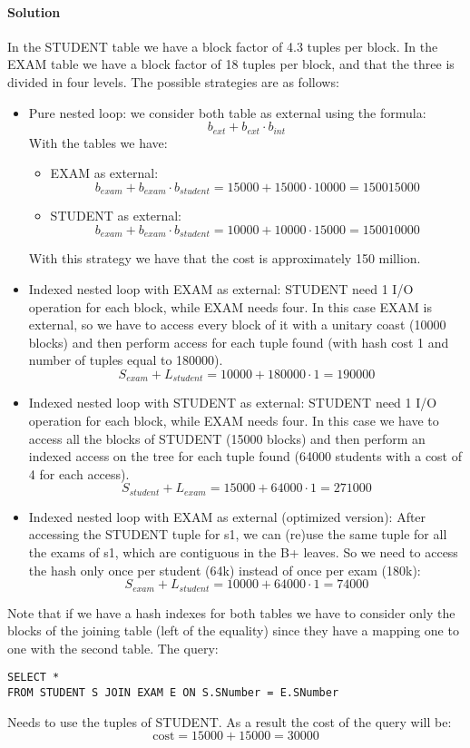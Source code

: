 \paragraph*{Solution}
In the STUDENT table we have a block factor of 4.3 tuples per block. 
In the EXAM table we have a block factor of 18 tuples per block, and that the three is divided in four levels. 
The possible strategies are as follows: 
\begin{itemize}
    \item Pure nested loop: we consider both table as external using the formula: 
        \[b_{ext}+b_{ext}\cdot b_{int}\]
        With the tables we have: 
        \begin{itemize}
            \item EXAM as external: 
                \[b_{exam}+b_{exam}\cdot b_{student}=15000+15000\cdot 10000=150015000\]
            \item STUDENT as external: 
                \[b_{exam}+b_{exam}\cdot b_{student}=10000+10000\cdot 15000=150010000\]
        \end{itemize}
        With this strategy we have that the cost is approximately 150 million. 
    \item Indexed nested loop with EXAM as external: 
        STUDENT need 1 I/O operation for each block, while EXAM needs four. 
        In this case EXAM is external, so we have to access every block of it with a unitary coast (10000 blocks) and then perform access for each tuple found (with hash cost 1 and number of tuples equal to 180000).
        \[S_{exam}+L_{student}=10000+180000 \cdot 1=190000\]
    \item Indexed nested loop with STUDENT as external: 
        STUDENT need 1 I/O operation for each block, while EXAM needs four. 
        In this case we have to access all the blocks of STUDENT (15000 blocks) and then perform an indexed access on the tree for each tuple found (64000 students with a cost of 4 for each access). 
        \[S_{student}+L_{exam}=15000+64000 \cdot 1=271000\]
    \item Indexed nested loop with EXAM as external (optimized version): 
        After accessing the STUDENT tuple for s1, we can (re)use the same tuple for all the exams of s1, which are contiguous in the B+ leaves. 
        So we need to access the hash only once per student (64k) instead of once per exam (180k): 
        \[S_{exam}+L_{student}=10000+64000 \cdot 1=74000\]
\end{itemize}
Note that if we have a hash indexes for both tables we have to consider only the blocks of the joining table (left of the equality) since they have a mapping one to one with the second table. 
The query: 
\begin{lstlisting}[style=SQL]
SELECT *
FROM STUDENT S JOIN EXAM E ON S.SNumber = E.SNumber 
\end{lstlisting}
Needs to use the tuples of STUDENT. 
As a result the cost of the query will be: 
\[\text{cost}=15000+15000=30000\]